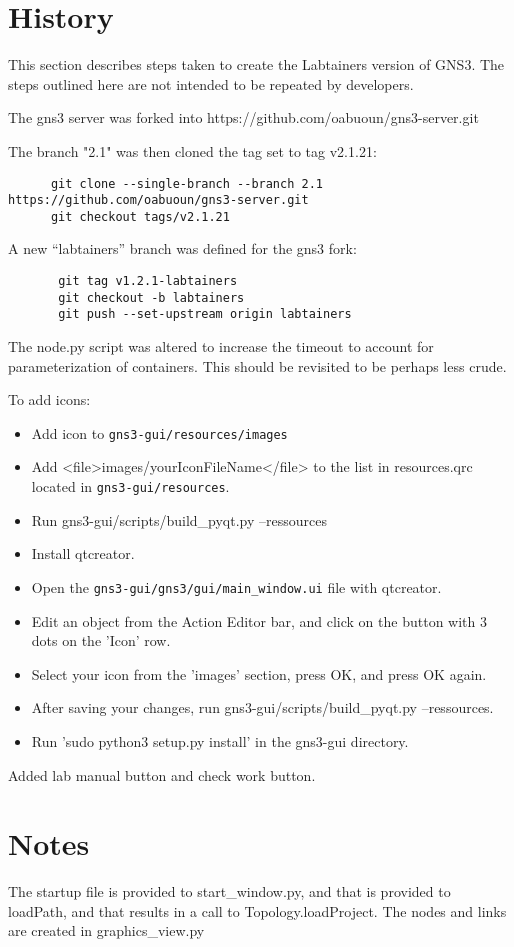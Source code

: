 \documentclass[12pt]{article}
\begin{document}
\section{History}
This section describes steps taken to create the Labtainers version of GNS3.
The steps outlined here are not intended to be repeated by developers.

The gns3 server was forked into https://github.com/oabuoun/gns3-server.git

The branch "2.1" was then cloned the tag set to tag v2.1.21:
\small
\begin{verbatim}
      git clone --single-branch --branch 2.1 https://github.com/oabuoun/gns3-server.git
      git checkout tags/v2.1.21
\end{verbatim}

\normalsize
\noindent A new ``labtainers'' branch was defined for the gns3 fork:
\begin{verbatim}
       git tag v1.2.1-labtainers
       git checkout -b labtainers
       git push --set-upstream origin labtainers
\end{verbatim}

The node.py script was altered to increase the timeout to account for parameterization of
containers.  This should be revisited to be perhaps less crude.

\bigskip
To add icons: 
\begin{itemize}
	\item Add icon to {\tt gns3-gui/resources/images}
	\item Add  <file>images/yourIconFileName</file> to the list in resources.qrc located in {\tt gns3-gui/resources}.
	\item Run gns3-gui/scripts/build\_pyqt.py --ressources
	\item Install qtcreator. 
	\item Open the {\tt gns3-gui/gns3/gui/main\_window.ui} file with qtcreator.
	\item Edit an object from the Action Editor bar, and click on the button with 3 dots on the 'Icon' row. 
	\item Select your icon from the 'images' section, press OK, and press OK again.
	\item After saving your changes, run gns3-gui/scripts/build\_pyqt.py --ressources.
	\item Run 'sudo python3 setup.py install' in the gns3-gui directory.
\end{itemize}
Added lab manual button and check work button.
\section{Notes}
The startup file is provided to start\_window.py, and that is provided to loadPath, and that results in
a call to Topology.loadProject.  The nodes and links are created in graphics\_view.py
\end{document}
